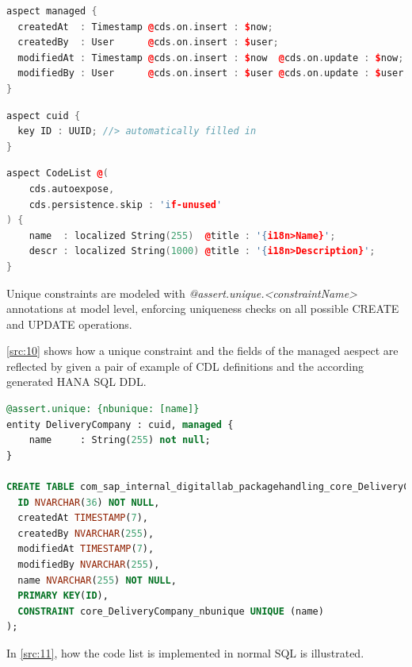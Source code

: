 \begin{lstlisting}[language={c++}]
aspect managed {
  createdAt  : Timestamp @cds.on.insert : $now;
  createdBy  : User      @cds.on.insert : $user;
  modifiedAt : Timestamp @cds.on.insert : $now  @cds.on.update : $now;
  modifiedBy : User      @cds.on.insert : $user @cds.on.update : $user;
}
\end{lstlisting}

\begin{lstlisting}[language={c++}]
aspect cuid {
  key ID : UUID; //> automatically filled in
}
\end{lstlisting}

\begin{lstlisting}[language={c++}]
aspect CodeList @(
    cds.autoexpose,
    cds.persistence.skip : 'if-unused'
) {
    name  : localized String(255)  @title : '{i18n>Name}';
    descr : localized String(1000) @title : '{i18n>Description}';
}
\end{lstlisting}

Unique constraints are modeled with \textit{@assert.unique.<constraintName>} annotations \cite{cap-cds-common-annotations} at model level, enforcing uniqueness checks on all possible CREATE and UPDATE operations.

\autoref{src:10} shows how a unique constraint and the fields of the managed aespect are reflected by given a pair of example of CDL definitions and the according generated HANA SQL DDL.

\begin{lstlisting}[language={sql}]
@assert.unique: {nbunique: [name]}
entity DeliveryCompany : cuid, managed {
    name     : String(255) not null;
}

CREATE TABLE com_sap_internal_digitallab_packagehandling_core_DeliveryCompany (
  ID NVARCHAR(36) NOT NULL,
  createdAt TIMESTAMP(7),
  createdBy NVARCHAR(255),
  modifiedAt TIMESTAMP(7),
  modifiedBy NVARCHAR(255),
  name NVARCHAR(255) NOT NULL,
  PRIMARY KEY(ID),
  CONSTRAINT core_DeliveryCompany_nbunique UNIQUE (name)
); 
\end{lstlisting}


In \autoref{src:11}, how the code list is implemented in normal SQL is illustrated.

